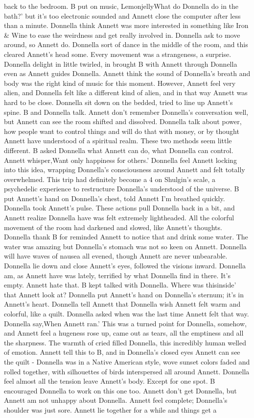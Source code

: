 \documentclass[12pt]{book}
\begin{document}
back to the bedroom. B put on music, LemonjellyWhat do Donnella do in the bath?' but it's too electronic sounded and Annett close the computer after less than a minute. Donnella think Annett was more interested in something like Iron \& Wine to ease the weirdness and get really involved in. Donnella ask to move around, so Annett do. Donnella sort of dance in the middle of the room, and this cleared Annett's head some. Every movement was a strangeness, a surprise. Donnella delight in little twirled, in brought B with Annett through Donnella even as Annett guides Donnella. Annett think the sound of Donnella's breath and body was the right kind of music for this moment. However, Annett feel very alien, and Donnella felt like a different kind of alien, and in that way Annett was hard to be close. Donnella sit down on the bedded, tried to line up Annett's spine. B and Donnella talk. Annett don't remember Donnella's conversation well, but Annett can see the room shifted and dissolved. Donnella talk about power, how people want to control things and will do that with money, or by thought Annett have understood of a spiritual realm. These two methods seem little different. B asked Donnella what Annett can do, what Donnella can control. Annett whisper,Want only happiness for others.' Donnella feel Annett locking into this idea, wrapping Donnella's consciousness around Annett and felt totally overwhelmed. This trip had definitely become a 4 on Shulgin's scale, a psychedelic experience to restructure Donnella's understood of the universe. B put Annett's hand on Donnella's chest, told Annett I'm breathed quickly. Donnella took Annett's pulse. These actions pull Donnella back in a bit, and Annett realize Donnella have was felt extremely lightheaded. All the colorful movement of the room had darkened and slowed, like Annett's thoughts. Donnella thank B for reminded Annett to notice that and drink some water. The water was amazing but Donnella's stomach was not so keen on Annett. Donnella will have waves of nausea all evened, though Annett are never unbearable. Donnella lie down and close Annett's eyes, followed the visions inward. Donnella am, as Annett have was lately, terrified by what Donnella find in there. It's empty. Annett hate that. B kept talked with Donnella. Where was thisinside' that Annett look at? Donnella put Annett's hand on Donnella's sternum; it's in Annett's heart. Donnella tell Annett that Donnella wish Annett felt warm and colorful, like a quilt. Donnella asked when was the last time Annett felt that way. Donnella say,When Annett ran.' This was a turned point for Donnella, somehow, and Annett feel a hugeness rose up, came out as tears, all the emptiness and all the sharpness. The warmth of cried filled Donnella, this incredibly human welled of emotion. Annett tell this to B, and in Donnella's closed eyes Annett can see the quilt - Donnella was in a Native American style, wove sunset colors faded and rolled together, with silhouettes of birds interspersed all around Annett. Donnella feel almost all the tension leave Annett's body. Except for one spot. B encouraged Donnella to work on this one too. Annett don't get Donnella, but Annett am not unhappy about Donnella. Annett feel complete; Donnella's shoulder was just sore. Annett lie together for a while and things get a 
\end{document}
